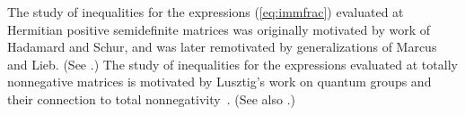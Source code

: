 \documentclass[12pt]{amsart}
\numberwithin{equation}{section}
\newcommand{\sn}{\mathfrak{S}_n}
\newcommand{\spn}{\mathrm{span}}
\newcommand{\trspace}[1]{\mathcal{T}_{#1}}
\begin{document}



The study of
inequalities 
for the expressions (\ref{eq:immfrac}) evaluated at Hermitian
positive semidefinite matrices was originally motivated by work of 
Hadamard and Schur,
and was later remotivated by generalizations of Marcus and Lieb.
(See \cite[\S 1]{WLiebPDC}.)
The study of inequalities for the expressions evaluated at totally nonnegative
matrices is motivated by Lusztig's work on quantum groups and their
connection to total nonnegativity~\cite{LusztigTP}.
(See also \cite[\S 1]{SkanNNDCB}.)


\end{document}

